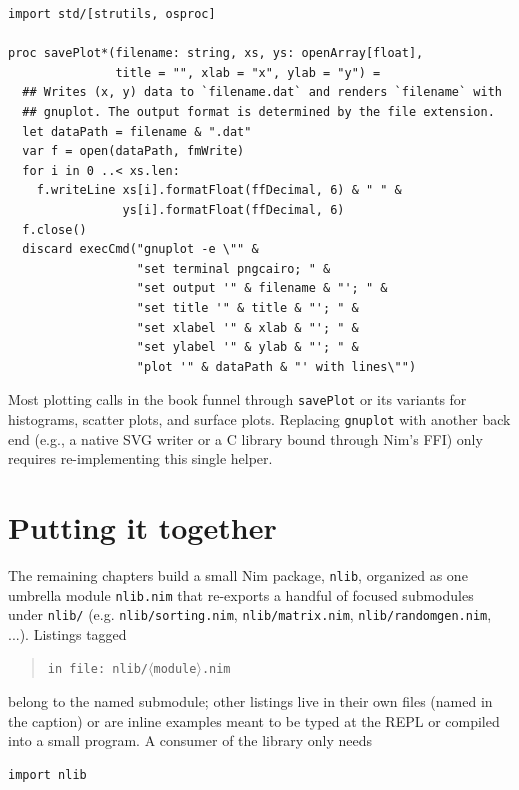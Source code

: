 \documentclass[justified, sixbynine]{tufte-book}
\def\ft{\small\tt}
\theoremstyle{plain}%
\newtheorem * {corollary}{Corollary}
\theoremstyle{definition}
\theoremstyle{remark}
\newtheorem * {remark}{Remark}
\newtheorem * {note}{Note}
\begin{document}
\begin{fullwidth}
\begin{lstlisting}[caption={in file: {\ft nlib/plotting.nim}}]
import std/[strutils, osproc]

proc savePlot*(filename: string, xs, ys: openArray[float],
               title = "", xlab = "x", ylab = "y") =
  ## Writes (x, y) data to `filename.dat` and renders `filename` with
  ## gnuplot. The output format is determined by the file extension.
  let dataPath = filename & ".dat"
  var f = open(dataPath, fmWrite)
  for i in 0 ..< xs.len:
    f.writeLine xs[i].formatFloat(ffDecimal, 6) & " " &
                ys[i].formatFloat(ffDecimal, 6)
  f.close()
  discard execCmd("gnuplot -e \"" &
                  "set terminal pngcairo; " &
                  "set output '" & filename & "'; " &
                  "set title '" & title & "'; " &
                  "set xlabel '" & xlab & "'; " &
                  "set ylabel '" & ylab & "'; " &
                  "plot '" & dataPath & "' with lines\"")
\end{lstlisting}

Most plotting calls in the book funnel through {\ft savePlot} or its variants for histograms, scatter plots, and surface plots. Replacing {\ft gnuplot} with another back end (e.g., a native SVG writer or a C library bound through Nim's FFI) only requires re-implementing this single helper.

\goodbreak\section{Putting it together}

The remaining chapters build a small Nim package, {\ft nlib}, organized as one umbrella module {\ft nlib.nim} that re-exports a handful of focused submodules under {\ft nlib/} (e.g. {\ft nlib/sorting.nim}, {\ft nlib/matrix.nim}, {\ft nlib/randomgen.nim}, ...). Listings tagged

\begin{quote}
{\ft in file: nlib/$\langle$module$\rangle$.nim}
\end{quote}

belong to the named submodule; other listings live in their own files (named in the caption) or are inline examples meant to be typed at the REPL or compiled into a small program. A consumer of the library only needs

\begin{lstlisting}
import nlib
\end{lstlisting}


\end{fullwidth}
\end{document}

